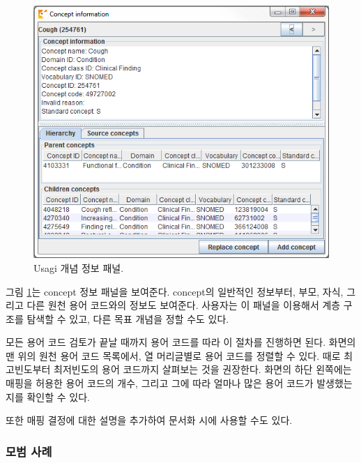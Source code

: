 \documentclass[10.5pt]{book}
\theoremstyle{definition}
\theoremstyle{definition}
\theoremstyle{definition}
\theoremstyle{remark}
\begin{document}
\begin{figure}

{\centering \includegraphics[width=1\linewidth]{images/ExtractTransformLoad/usagiConceptInfo} 

}

\caption{Usagi 개념 정보 패널.}\label{fig:usagiConceptInfo}
\end{figure}

그림 \ref{fig:usagiConceptInfo}는 concept 정보 패널을 보여준다.
concept의 일반적인 정보부터, 부모, 자식, 그리고 다른 원천 용어 코드와의
정보도 보여준다. 사용자는 이 패널을 이용해서 계층 구조를 탐색할 수 있고,
다른 목표 개념을 정할 수도 있다.

모든 용어 코드 검토가 끝날 때까지 용어 코드를 따라 이 절차를 진행하면
된다. 화면의 맨 위의 원천 용어 코드 목록에서, 열 머리글별로 용어 코드를
정렬할 수 있다. 때로 최고빈도부터 최저빈도의 용어 코드까지 살펴보는 것을
권장한다. 화면의 하단 왼쪽에는 매핑을 허용한 용어 코드의 개수, 그리고
그에 따라 얼마나 많은 용어 코드가 발생했는지를 확인할 수 있다.

또한 매핑 결정에 대한 설명을 추가하여 문서화 시에 사용할 수도 있다.

\subsubsection*{모범 사례}\label{-}
\end{document}
